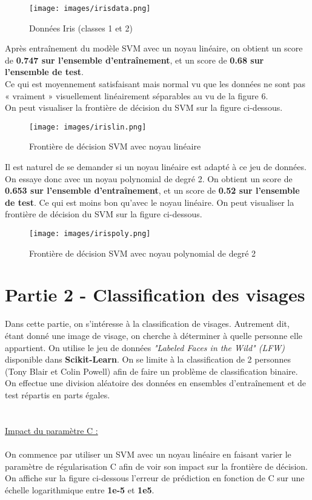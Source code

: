 \documentclass[a4paper, 12pt]{article}
\begin{document}
\begin{figure}[h]
    \centering
    \texttt{[image: images/irisdata.png]}
    \caption{Données Iris (classes 1 et 2)}
    \label{fig:iris_data}
\end{figure}

Après entraînement du modèle SVM avec un noyau linéaire, on obtient un score de \textbf{0.747 sur l'ensemble d'entraînement}, et un score de \textbf{0.68 sur l'ensemble de test}.
\\
Ce qui est moyennement satisfaisant mais normal vu que les données ne sont pas « vraiment » visuellement linéairement séparables au vu de la figure 6.
\\
On peut visualiser la frontière de décision du SVM sur la figure ci-dessous.
\newpage
\begin{figure}[h!]
    \centering
    \texttt{[image: images/irislin.png]}
    \caption{Frontière de décision SVM avec noyau linéaire}
    \label{fig:linear_kernel_iris}
\end{figure}

\par Il est naturel de se demander si un noyau linéaire est adapté à ce jeu de données. On essaye donc avec un noyau polynomial de degré 2. On obtient un score de \textbf{0.653 sur l'ensemble d'entraînement}, et un score de \textbf{0.52 sur l'ensemble de test}.
Ce qui est moins bon qu'avec le noyau linéaire. On peut visualiser la frontière de décision du SVM sur la figure ci-dessous.

\begin{figure}[h]
    \centering
    \texttt{[image: images/irispoly.png]}
    \caption{Frontière de décision SVM avec noyau polynomial de degré 2}
    \label{fig:poly2_kernel_iris}
\end{figure}

\newpage

\section*{Partie 2 - Classification des visages}

Dans cette partie, on s'intéresse à la classification de visages. Autrement dit, étant donné une image de visage, on cherche à déterminer à quelle personne elle appartient.
On utilise le jeu de données \textit{"Labeled Faces in the Wild" (LFW)} disponible dans \textbf{Scikit-Learn}. On se limite à la classification de 2 personnes (Tony Blair et Colin Powell) afin de faire un problème de classification binaire.
On effectue une division aléatoire des données en ensembles d'entraînement et de test répartis en parts égales.
\\
\\
\\
\underline{Impact du paramètre C :}
\\
\\
On commence par utiliser un SVM avec un noyau linéaire en faisant varier le paramètre de régularisation C afin de voir son impact sur la frontière de décision.
\\
On affiche sur la figure ci-dessous l'erreur de prédiction en fonction de C sur une échelle logarithmique entre \textbf{1e-5} et \textbf{1e5}.
\end{document}
